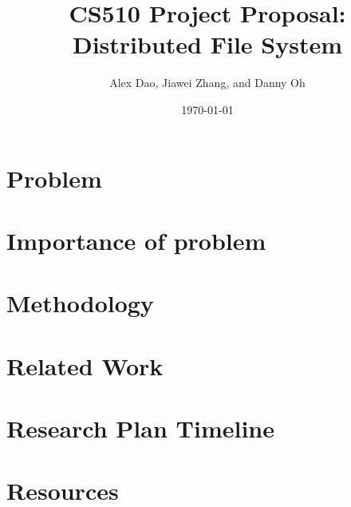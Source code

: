 \documentclass{article}
\title{CS510 Project Proposal:  Distributed File System}
\date{\today}
\author{Alex Dao, Jiawei Zhang, and Danny Oh}
\begin{document}
\maketitle

\section{Problem}

\section{Importance of problem}

\section{Methodology}

\section{Related Work}

\section{Research Plan Timeline}

\section{Resources}
\end{document}
